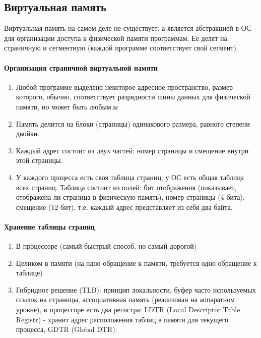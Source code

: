 \documentclass[]{article}
\begin{document}
			\subsection{Виртуальная память}
			Виртуальная память на самом деле не существует, а является абстракцией в ОС для организации доступа к физической памяти программам. Ее делят на страничную и сегментную (каждой программе соответствует свой сегмент).
			
			\paragraph{Организация страничной виртуальной памяти}
			\begin{enumerate}
				\item Любой программе выделено некоторое адресное пространство, размер которого, обычно, соответствует разрядности шины данных для физической памяти, но может быть любым.ы
				\item Память делится на блоки (страницы) одинакового размера, равного степени двойки.
				\item Каждый адрес состоит из двух частей: номер страницы и смещение внутри этой страницы.
				\item У каждого процесса есть своя таблица страниц, у ОС есть общая таблица всех страниц. Таблица состоит из полей: бит отображения (показывает, отображена ли страница в физическую память), номер страницы (4 бита), смещение (12 бит), т.е. каждый адрес представляет из себя два байта.
			\end{enumerate}
			
			\paragraph{Хранение таблицы страниц}
			\begin{enumerate}
				\item В процессоре (самый быстрый способ, но самый дорогой)
				\item Целиком в памяти (на одно обращение к памяти, требуется одно обращение к таблице)
				\item Гибридное решение (TLB): принцип локальности, буфер часто используемых ссылок на страницы, ассоциативная память (реализован на аппаратном уровне), в процессоре есть два регистра: LDTR (Local Descriptor Table Registr) - хранит адрес расположения таблиц в памяти для текущего процесса, GDTR (Global DTR).
			\end{enumerate}
		
\end{document}
